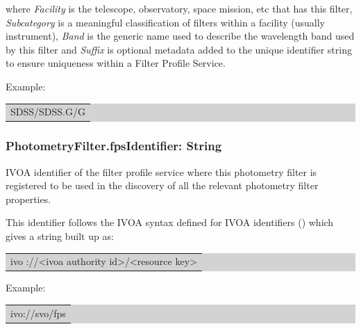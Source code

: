 \documentclass[11pt,a4paper]{ivoa}
\begin{document}

where \textit{Facility} is the telescope, observatory, space mission, etc that has this filter, \textit{Subcategory} is a meaningful classification of filters within a facility (usually instrument), \textit{Band} is the generic name used to describe the wavelength band used by this filter and \textit{Suffix} is optional metadata added to the unique identifier string to ensure uniqueness within a Filter Profile Service.
\par

Example:
\par


\bigskip
\begingroup\setlength{\fboxsep}{0pt}
\colorbox{lightgray}{%
\begin{tabular}{|p{5.53in}|}
SDSS/SDSS.G/G
\end{tabular}%
}\endgroup
\par
\bigskip


\subsubsection{PhotometryFilter.fpsIdentifier: String}
IVOA identifier of the filter profile service where this photometry filter is registered to be used in the discovery of all the relevant photometry filter properties.
\par

This identifier follows the IVOA syntax defined for IVOA identifiers (\cite{plante}) which gives a string built up as:
\par

\bigskip
\begingroup\setlength{\fboxsep}{0pt}
\colorbox{lightgray}{%
\begin{tabular}{|p{5.53in}|}
ivo ://<ivoa authority id>/<resource key>
\end{tabular}%
}\endgroup
\par
\bigskip




Example:
\par

\bigskip
\begingroup\setlength{\fboxsep}{0pt}
\colorbox{lightgray}{%
\begin{tabular}{|p{5.53in}|}
ivo://svo/fps
\end{tabular}%
}\endgroup
\par
\bigskip
\end{document}

